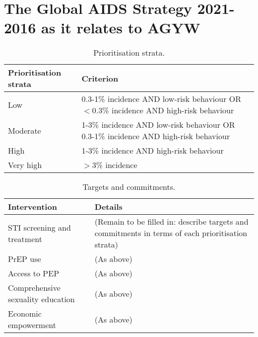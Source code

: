 \documentclass[
]{article}
\begin{document}
\newpage

\hypertarget{the-global-aids-strategy-2021-2016-as-it-relates-to-agyw}{%
\section{The Global AIDS Strategy 2021-2016 as it relates to
AGYW}\label{the-global-aids-strategy-2021-2016-as-it-relates-to-agyw}}

\begin{footnotesize}

\begin{table}[h]
\centering
\begin{tabularx}{\textwidth}{lX}
\toprule
Prioritisation strata & Criterion \\ 
 \midrule
Low & 0.3-1\% incidence AND low-risk behaviour OR $<$0.3\% incidence AND high-risk behaviour \\
Moderate & 1-3\% incidence AND low-risk behaviour OR 0.3-1\% incidence AND high-risk behaviour \\
High & 1-3\% incidence AND high-risk behaviour \\
Very high & $>$3\% incidence \\
\bottomrule
\end{tabularx}
\caption{Prioritisation strata.}
\label{tab:unaids-strategy-prioritisation}
\end{table}

\end{footnotesize}

\begin{footnotesize}

\begin{table}[h]
\centering
\begin{tabularx}{\textwidth}{lX}
\toprule
Intervention & Details \\ 
 \midrule
STI screening and treatment & (Remain to be filled in: describe targets and commitments in terms of each prioritisation strata) \\
PrEP use & (As above) \\
Access to PEP & (As above) \\
Comprehensive sexuality education & (As above) \\
Economic empowerment & (As above) \\
\bottomrule
\end{tabularx}
\caption{Targets and commitments.}
\label{tab:unaids-strategy-targets}
\end{table}

\end{footnotesize}
\end{document}
